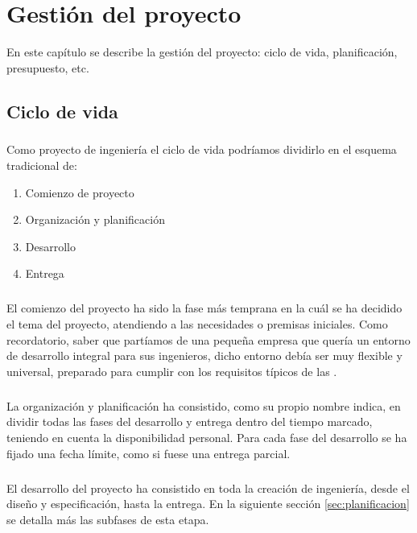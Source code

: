 \chapter{Gestión del proyecto}\label{sec:gestion}

En este capítulo se describe la gestión del proyecto: ciclo de vida, planificación,
presupuesto, etc.

\section{Ciclo de vida}

\paragraph{}Como proyecto de ingeniería el ciclo de vida podríamos dividirlo en el
esquema tradicional de:

\begin{enumerate}
  \item Comienzo de proyecto
  \item Organización y planificación
  \item Desarrollo
  \item Entrega
\end{enumerate}

\paragraph{}El comienzo del proyecto ha sido la fase más temprana en la cuál se ha
decidido el tema del proyecto, atendiendo a las necesidades o premisas iniciales. Como
recordatorio, saber que partíamos de una pequeña empresa que quería un entorno de desarrollo
integral para sus ingenieros, dicho entorno debía ser muy flexible y universal, preparado
para cumplir con los requisitos típicos de las .

\paragraph{}La organización y planificación ha consistido, como su propio nombre indica,
en dividir todas las fases del desarrollo y entrega dentro del tiempo marcado, teniendo
en cuenta la disponibilidad personal. Para cada fase del desarrollo se ha fijado una
fecha límite, como si fuese una entrega parcial.

\paragraph{}El desarrollo del proyecto ha consistido en toda la creación de ingeniería,
desde el diseño y especificación, hasta la entrega. En la siguiente sección \ref{sec:planificacion}
se detalla más las subfases de esta etapa.

